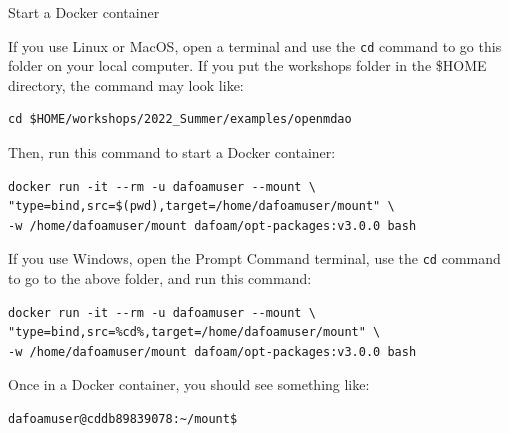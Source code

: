 \documentclass{bredelebeamer}
\begin{document}
\begin{frame}[fragile]{Start a Docker container}

  If you use Linux or MacOS, open a terminal and use the \texttt{cd} command to go this folder on your local computer. If you put the workshops folder in the \$HOME directory, the command may look like:

  \footnotesize
  \begin{lstlisting}
cd $HOME/workshops/2022_Summer/examples/openmdao
  \end{lstlisting}
  \normalsize
  
  Then, run this command to start a Docker container:

  \footnotesize
  \begin{lstlisting}
docker run -it --rm -u dafoamuser --mount \
"type=bind,src=$(pwd),target=/home/dafoamuser/mount" \ 
-w /home/dafoamuser/mount dafoam/opt-packages:v3.0.0 bash
  \end{lstlisting}
  \normalsize

  If you use Windows, open the Prompt Command terminal, use the \texttt{cd} command to go to the above folder, and run this command: \\ \vspace{0.1in}

  \footnotesize
  \begin{lstlisting}
docker run -it --rm -u dafoamuser --mount \
"type=bind,src=%cd%,target=/home/dafoamuser/mount" \
-w /home/dafoamuser/mount dafoam/opt-packages:v3.0.0 bash
  \end{lstlisting}
  \normalsize

  Once in a Docker container, you should see something like:
  \footnotesize
  \lstset{ language=bash }
  \begin{lstlisting}
dafoamuser@cddb89839078:~/mount$ 
  \end{lstlisting}
  \normalsize

\end{frame}
\end{document}
